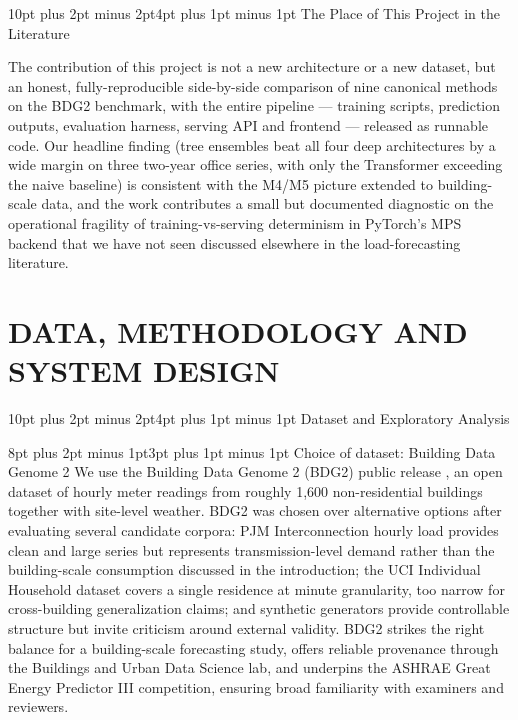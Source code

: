 \documentclass[12pt,a4paper,openany]{report}
\makeatletter
\renewcommand{\section}{\@startsection{section}{1}{\z@}%
  {10pt plus 2pt minus 2pt}{4pt plus 1pt minus 1pt}%
  {\normalfont\normalsize\bfseries}}
\renewcommand{\subsection}{\@startsection{subsection}{2}{\z@}%
  {8pt plus 2pt minus 1pt}{3pt plus 1pt minus 1pt}%
  {\normalfont\normalsize\bfseries}}
\makeatother
\begin{document}
\section{The Place of This Project in the Literature}

The contribution of this project is not a new architecture or a new dataset, but an honest, fully-reproducible side-by-side comparison of nine canonical methods on the BDG2 benchmark, with the entire pipeline --- training scripts, prediction outputs, evaluation harness, serving API and frontend --- released as runnable code. Our headline finding (tree ensembles beat all four deep architectures by a wide margin on three two-year office series, with only the Transformer exceeding the naive baseline) is consistent with the M4/M5 picture extended to building-scale data, and the work contributes a small but documented diagnostic on the operational fragility of training-vs-serving determinism in PyTorch's MPS backend that we have not seen discussed elsewhere in the load-forecasting literature.


\chapter{DATA, METHODOLOGY AND SYSTEM DESIGN}

\section{Dataset and Exploratory Analysis}

\subsection{Choice of dataset: Building Data Genome 2}
We use the Building Data Genome 2 (BDG2) public release \cite{ref_miller_bdg2}, an open dataset of hourly meter readings from roughly 1{,}600 non-residential buildings together with site-level weather. BDG2 was chosen over alternative options after evaluating several candidate corpora: PJM Interconnection hourly load \cite{ref_pjm} provides clean and large series but represents transmission-level demand rather than the building-scale consumption discussed in the introduction; the UCI Individual Household dataset \cite{ref_uci_household} covers a single residence at minute granularity, too narrow for cross-building generalization claims; and synthetic generators provide controllable structure but invite criticism around external validity. BDG2 strikes the right balance for a building-scale forecasting study, offers reliable provenance through the Buildings and Urban Data Science lab, and underpins the ASHRAE Great Energy Predictor III competition, ensuring broad familiarity with examiners and reviewers.
\end{document}
